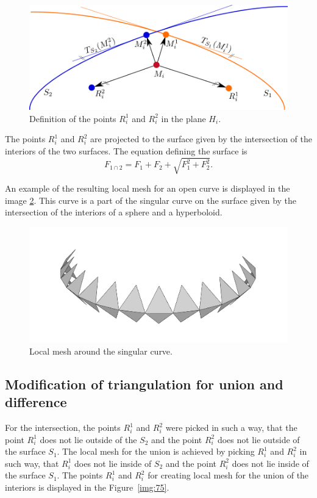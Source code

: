 \begin{figure}[h!]
    \centerline{\includegraphics[scale=0.5]{images/img39}}
    \caption[Definition of the points $R_i^1$ and $R_i^2$]
    {Definition of the points $R_i^1$ and $R_i^2$ in the plane $H_i$.}
    \label{img:39}
\end{figure}

The points $R_i^1$ and $R_i^2$ are projected to the surface given by the intersection
of the interiors of the two surfaces. The equation defining the surface is 
$$F_{1 \cap 2} = F_1 + F_2 + \sqrt{F_1^2+F_2^2}.$$

An example of the resulting local mesh for an open curve is displayed in the image
\ref{img:local-mesh-sing-curve}. This curve is a part of the singular curve on the surface 
given by the intersection of the interiors of a sphere and a hyperboloid.

\begin{figure}[h!]
    \centerline{\includegraphics[scale=0.3]{images/local-mesh-sing-curve}}
    \caption[Local mesh around the singular curve]
    {Local mesh around the singular curve.}
    \label{img:local-mesh-sing-curve}
\end{figure}

\subsection{Modification of triangulation for union and difference}
For the intersection, the points $R_i^1$ and $R_i^2$ were picked in such a way, that the point
$R_i^1$ does not lie outside of the $S_2$ and the point $R_i^2$ does not lie outside of 
the surface $S_1$. The local mesh for the union is achieved by picking $R_i^1$ and $R_i^2$
in such way, that $R_i^1$ does not lie inside of $S_2$ and the point $R_i^2$ does not lie 
inside of the surface $S_1$. The points $R_i^1$ and $R_i^2$ for creating local mesh for 
the union of the interiors is displayed in the Figure~\ref{img:75}.

